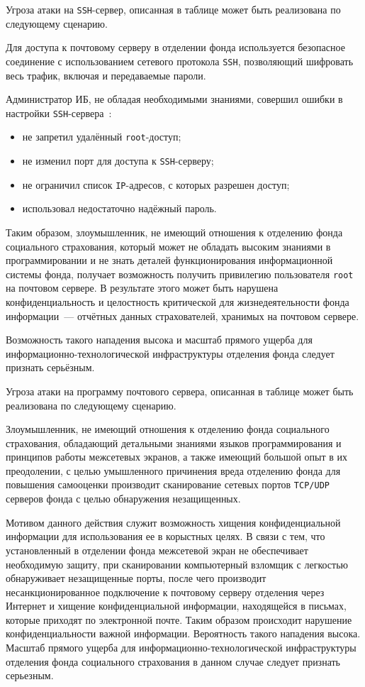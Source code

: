 \point Угроза атаки на \texttt{SSH}-сервер, описанная в таблице может
быть реализована по следующему сценарию.

\point Для доступа к почтовому серверу в отделении фонда используется
безопасное соединение с использованием сетевого протокола
\texttt{SSH}, позволяющий шифровать весь трафик, включая и
передаваемые пароли.

Администратор ИБ, не обладая необходимыми знаниями, совершил ошибки в
настройки \texttt{SSH}-сервера~\cite{4}:

\begin{itemize}
\item не запретил удалённый \texttt{root}-доступ;
\item не изменил порт для доступа к \texttt{SSH}-серверу;
\item не ограничил список \texttt{IP}-адресов, с которых разрешен
  доступ;
\item использовал недостаточно надёжный пароль.
\end{itemize}

Таким образом, злоумышленник, не имеющий отношения к отделению фонда
социального страхования, который может не обладать высоким знаниями в
программировании и не знать деталей функционирования информационной
системы фонда, получает возможность получить привилегию пользователя
\texttt{root} на почтовом сервере. В результате этого может быть
нарушена конфиденциальность и целостность критической для
жизнедеятельности фонда информации~--- отчётных данных страхователей,
хранимых на почтовом сервере.

Возможность такого нападения высока и масштаб прямого ущерба для
информационно-технологической инфраструктуры отделения фонда следует
признать серьёзным.

\point Угроза атаки на программу почтового сервера, описанная в
таблице может быть реализована по следующему сценарию.

\point Злоумышленник, не имеющий отношения к отделению фонда
социального страхования, обладающий детальными знаниями языков
программирования и принципов работы межсетевых экранов, а также
имеющий большой опыт в их преодолении, с целью умышленного причинения
вреда отделению фонда для повышения самооценки производит сканирование
сетевых портов \texttt{TCP/UDP} серверов фонда с целью обнаружения
незащищенных.

Мотивом данного действия служит возможность хищения конфиденциальной
информации для использования ее в корыстных целях. В связи с тем, что
установленный в отделении фонда межсетевой экран не обеспечивает
необходимую защиту, при сканировании компьютерный взломщик с легкостью
обнаруживает незащищенные порты, после чего производит
несанкционированное подключение к почтовому серверу отделения через
Интернет и хищение конфиденциальной информации, находящейся в письмах,
которые приходят по электронной почте. Таким образом происходит
нарушение конфиденциальности важной информации. Вероятность такого
нападения высока. Масштаб прямого ущерба для
информационно-технологической инфраструктуры отделения фонда
социального страхования в данном случае следует признать серьезным.

